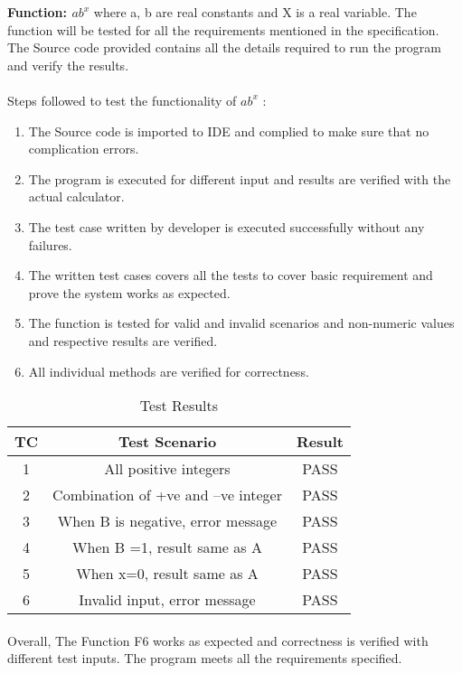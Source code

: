 \documentclass[12pt]{report}
\begin{document}
\large \textbf{Function: $ab^x$}  
\newline where a, b are real constants and X is a real variable. The function will be tested for all the requirements mentioned in the specification. The Source code provided contains all the details required to run the program and verify the results.

\paragraph{}
Steps followed to test the functionality of $ab^x$ :
\begin{enumerate}
    \item The Source code is imported to IDE and complied to make sure that no complication errors.
    \item The program is executed for different input and results are verified with the actual calculator.
    \item The test case written by developer is executed successfully without any failures.
    \item The written test cases covers all the tests to cover basic requirement and prove the system works as expected.
    \item The function is tested for valid and invalid scenarios and non-numeric values and respective results are verified.
    \item All individual methods are verified for correctness.
\end{enumerate}

\begin{table}[]
\centering
\begin{tabular}{|c |c| c|} 
\hline
TC & Test Scenario & Result \\ [0.5ex] 
\hline
1 & All positive integers & PASS \\
\hline
2 & Combination of +ve and –ve integer & PASS\\
\hline
3 & When B is negative, error message & PASS\\
\hline
4 & When B =1, result same as A & PASS\\
\hline
5 & When x=0, result same as A & PASS\\
\hline
6 & Invalid input, error message & PASS\\
\hline
\end{tabular}
\caption{Test Results}
\end{table}

\paragraph{}
Overall, The Function F6 works as expected and correctness is verified with different test inputs. The program meets all the requirements specified.
\end{document}

